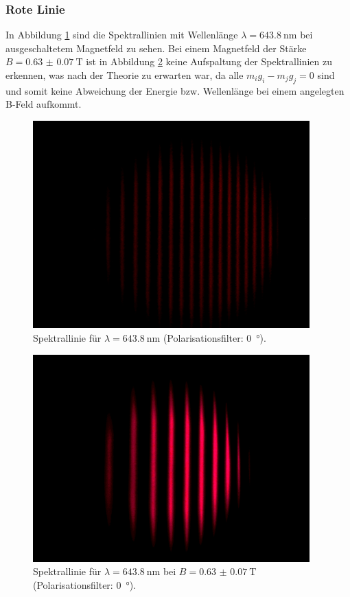 \subsubsection{Rote Linie}
In Abbildung \ref{fig:rot_pi_0A} sind die Spektrallinien mit Wellenlänge $\lambda=\SI{643.8}{\nano\meter}$ bei ausgeschaltetem Magnetfeld zu sehen.
Bei einem Magnetfeld der Stärke $B=\SI{0.63(7)}{\tesla}$ ist in Abbildung \ref{fig:rot_pi_10A} keine Aufspaltung der Spektrallinien zu erkennen,
was nach der Theorie zu erwarten war, da alle $m_ig_i-m_jg_j=0$ sind und somit keine Abweichung der Energie bzw. Wellenlänge bei einem angelegten B-Feld aufkommt.
\begin{figure}[htb]
  \centering
  \includegraphics[height=8cm]{content/pictures/rot_pi_0A.png}
  \caption{Spektrallinie für $\lambda=\SI{643.8}{\nano\meter}$ (Polarisationsfilter: \SI{0}{\degree}).}
  \label{fig:rot_pi_0A}
\end{figure}
\begin{figure}[htb]
  \centering
  \includegraphics[height=8cm]{content/pictures/rot_pi_10A.png}
  \caption{Spektrallinie für $\lambda=\SI{643.8}{\nano\meter}$ bei $B=\SI{0.63(7)}{\tesla}$ (Polarisationsfilter: \SI{0}{\degree}).}
  \label{fig:rot_pi_10A}
\end{figure}

